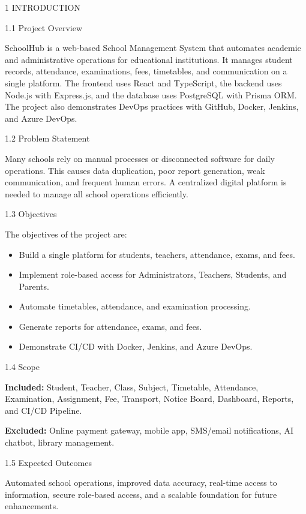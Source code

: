 1  INTRODUCTION

1.1  Project Overview

SchoolHub is a web-based School Management System that automates academic and administrative operations for educational institutions. It manages student records, attendance, examinations, fees, timetables, and communication on a single platform. The frontend uses React and TypeScript, the backend uses Node.js with Express.js, and the database uses PostgreSQL with Prisma ORM. The project also demonstrates DevOps practices with GitHub, Docker, Jenkins, and Azure DevOps.

1.2  Problem Statement

Many schools rely on manual processes or disconnected software for daily operations. This causes data duplication, poor report generation, weak communication, and frequent human errors. A centralized digital platform is needed to manage all school operations efficiently.

1.3  Objectives

The objectives of the project are:

\begin{itemize}
\item Build a single platform for students, teachers, attendance, exams, and fees.
\item Implement role-based access for Administrators, Teachers, Students, and Parents.
\item Automate timetables, attendance, and examination processing.
\item Generate reports for attendance, exams, and fees.
\item Demonstrate CI/CD with Docker, Jenkins, and Azure DevOps.
\end{itemize}

1.4  Scope

\textbf{Included:} Student, Teacher, Class, Subject, Timetable, Attendance, Examination, Assignment, Fee, Transport, Notice Board, Dashboard, Reports, and CI/CD Pipeline.

\textbf{Excluded:} Online payment gateway, mobile app, SMS/email notifications, AI chatbot, library management.

1.5  Expected Outcomes

Automated school operations, improved data accuracy, real-time access to information, secure role-based access, and a scalable foundation for future enhancements.
